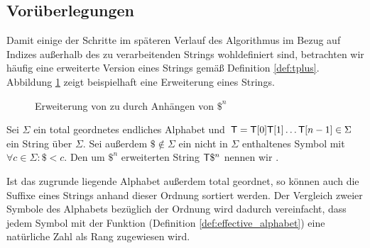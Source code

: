 \subsection{Vorüberlegungen}
\label{bpr:vorueberlegungen}

Damit einige der Schritte im späteren Verlauf des Algorithmus im Bezug auf Indizes außerhalb des zu verarbeitenden Strings wohldefiniert sind, betrachten wir häufig eine erweiterte Version eines Strings gemäß Definition \ref{def:tplus}. Abbildung \ref{fig:tplus} zeigt beispielhaft eine Erweiterung eines Strings.

\begin{figure}[ht]
	\caption{Erweiterung von  zu  durch Anhängen von \(\$^n\)}
	\label{fig:tplus}
\end{figure}

\begin{definition}[\inputtextplus]
	\label{def:tplus}
    Sei \(\Sigma\) ein total geordnetes endliches Alphabet und \(\inputtext = \inputtext[0] \inputtext[1] \ldots \inputtext[n-1] \in \Sigma\) ein String über \(\Sigma\). Sei außerdem \(\$ \notin \Sigma\) ein nicht in \(\Sigma\) enthaltenes Symbol mit \(\forall c \in \Sigma : \$ < c\). Den um \(\$^n\) erweiterten String \(\inputtext\$^n\) nennen wir .
\end{definition}

Ist das zugrunde liegende Alphabet außerdem total geordnet, so können auch die Suffixe eines Strings anhand dieser Ordnung sortiert werden.
Der Vergleich zweier Symbole des Alphabets bezüglich der Ordnung wird dadurch vereinfacht, dass jedem Symbol mit der Funktion \effective (Definition \ref{def:effective_alphabet}) eine natürliche Zahl als Rang zugewiesen wird.

